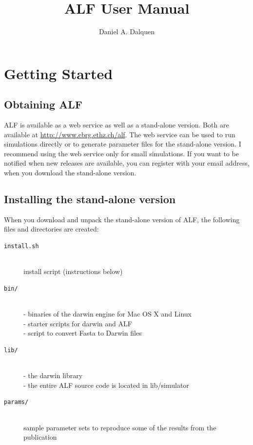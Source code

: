 \documentclass[11pt]{article}
\begin{document}
%
\nobibliography*

\title{ALF User Manual}
\author{Daniel A. Dalquen}
\maketitle

\section{Getting Started}
\subsection{Obtaining ALF}
ALF is available as a web service as well as a stand-alone version. Both are available at \url{http://www.cbrg.ethz.ch/alf}. The web service can be used to run simulations directly or to generate parameter files for the stand-alone version. I recommend using the web service only for small simulations. If you want to be notified when new releases are available, you can register with your email address, when you download the stand-alone version.

\subsection{Installing the stand-alone version}
When you download and unpack the stand-alone version of ALF, the following
files and directories are created:

\begin{description}
\item[\texttt{install.sh}] \hfill \\
install script (instructions below)
\item[\texttt{bin/}] \hfill \\
       - binaries of the darwin engine for Mac OS X and Linux\hfill \\
	   - starter scripts for darwin and ALF \hfill \\
	   - script to convert Fasta to Darwin files
\item[\texttt{lib/}] \hfill \\
       - the darwin library\hfill \\
	   - the entire ALF source code is located in lib/simulator
\item[\texttt{params/}] \hfill \\
sample parameter sets to reproduce some of the results from the publication
\end{description}
\end{document}
